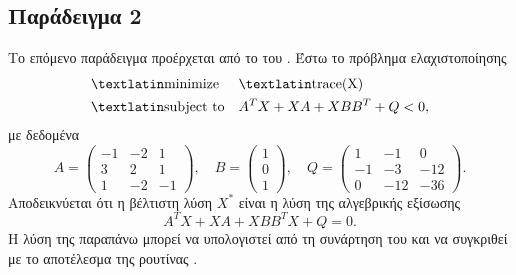 \subsection{Παράδειγμα 2}
Το επόμενο παράδειγμα προέρχεται από το  του 
\cite{gahinet1994lmi}. Έστω το πρόβλημα ελαχιστοποίησης
\begin{equation*}
    \begin{aligned}
        & \text{\tl{minimize}} & & \text{\tl{trace(X)}} \\
        & \text{\tl{subject to}} & & A^TX + XA + XBB^T + Q < 0,
    \end{aligned}
\end{equation*}
με δεδομένα
\begin{equation*}
    A = \begin{pmatrix}
        -1 & -2 & 1 \\
        3 & 2 & 1 \\
        1 & -2 & -1
    \end{pmatrix},\quad 
    B = \begin{pmatrix}
        1 \\
        0 \\
        1
    \end{pmatrix},\quad 
    Q = \begin{pmatrix}
        1 & -1 & 0 \\
        -1 & -3 & -12 \\
        0 & -12 & -36
    \end{pmatrix}.
\end{equation*}
Αποδεικνύεται ότι η βέλτιστη λύση \(X^*\) είναι η λύση της αλγεβρικής εξίσωσης
\begin{equation*}
    A^TX + XA + XBB^TX + Q = 0.
\end{equation*}
Η λύση της παραπάνω μπορεί να υπολογιστεί από τη συνάρτηση  του
 και να συγκριθεί με το αποτέλεσμα της  ρουτίνας
.

